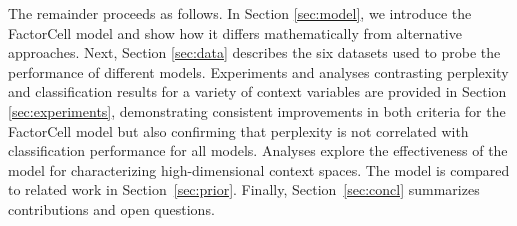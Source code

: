 The remainder proceeds as follows. In Section \ref{sec:model}, we introduce the FactorCell model and show how it differs mathematically from alternative approaches. Next, Section \ref{sec:data} describes the six datasets used to probe the performance of different models. Experiments and analyses contrasting perplexity and classification results for a variety of context variables are provided in Section \ref{sec:experiments}, demonstrating consistent improvements in both criteria for the FactorCell model but also confirming that perplexity is not correlated with classification performance for all models. Analyses 
explore the effectiveness of the model  for characterizing high-dimensional context spaces. The model is compared to related work in Section~\ref{sec:prior}. Finally, Section~\ref{sec:concl} summarizes contributions and open questions.
